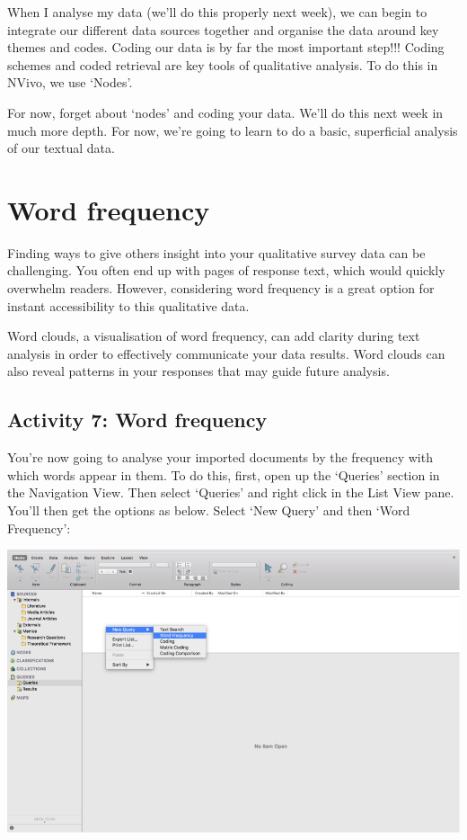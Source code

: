 \documentclass[]{book}
\theoremstyle{definition}
\theoremstyle{definition}
\theoremstyle{definition}
\theoremstyle{remark}
\begin{document}
When I analyse my data (we'll do this properly next week), we can begin
to integrate our different data sources together and organise the data
around key themes and codes. Coding our data is by far the most
important step!!! Coding schemes and coded retrieval are key tools of
qualitative analysis. To do this in NVivo, we use `Nodes'.

For now, forget about `nodes' and coding your data. We'll do this next
week in much more depth. For now, we're going to learn to do a basic,
superficial analysis of our textual data.

\hypertarget{word-frequency}{%
\section{Word frequency}\label{word-frequency}}

Finding ways to give others insight into your qualitative survey data
can be challenging. You often end up with pages of response text, which
would quickly overwhelm readers. However, considering word frequency is
a great option for instant accessibility to this qualitative data.

Word clouds, a visualisation of word frequency, can add clarity during
text analysis in order to effectively communicate your data results.
Word clouds can also reveal patterns in your responses that may guide
future analysis.

\hypertarget{activity-7-word-frequency}{%
\subsection{Activity 7: Word
frequency}\label{activity-7-word-frequency}}

You're now going to analyse your imported documents by the frequency
with which words appear in them. To do this, first, open up the
`Queries' section in the Navigation View. Then select `Queries' and
right click in the List View pane. You'll then get the options as below.
Select `New Query' and then `Word Frequency':

\includegraphics{imgs/qual_21.png}
\end{document}
